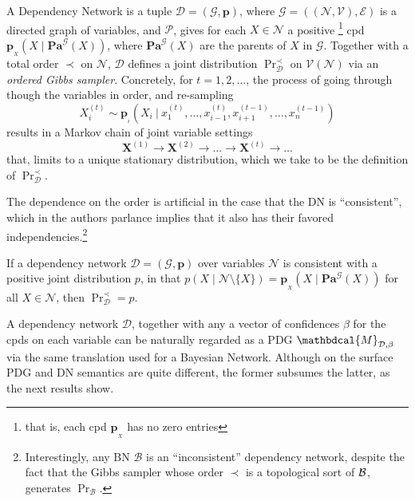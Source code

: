 \documentclass[letterpaper]{article} %
\theoremstyle{plain}
\theoremstyle{definition}
\theoremstyle{remark}
\newcommand{\begthm}[3][]{\begin{#2}[{name=#1},restate=#3,label=#3]}
\newcommand\mat[1]{\mathbf{#1}}
\newcommand{\dg}[1]{\mathbdcal{#1}}
\newcommand\Pa{\mathbf{Pa}}
\newcommand{\bp}[1][L]{\mat{p}_{\!_{#1}\!}}
\newcommand{\V}{\mathcal V}
\newcommand{\N}{\mathcal N}
\newcommand{\Ed}{\mathcal E}
\newcommand{\Gr}{\mathcal G}
\newcommand{\nvvars}[1][\N,\V]{(#1)}
\newcommand{\PDGof}[1]{{\dg M}_{#1}}
\begin{document}
\begin{defn}
A Dependency Network is a tuple $\mathcal D = (\Gr, \mat p) $, where $\Gr = (\nvvars,\Ed)$ is a
directed graph of variables, and $\mathcal P$, gives for each $X \in \N$ a positive%
	\footnote{that is, each cpd $\bp[X]$ has no zero entries}
cpd $\bp[X](X \mid \Pa^{\Gr}(X))$, where $\Pa^{\Gr}(X)$ are the parents of $X$ in $\Gr$.
Together with a total order $\prec$ on $\N$,
$\mathcal D$ defines a joint distribution $\Pr^\prec_{\mathcal D}$ on $\V(\N)$ via an \emph{ordered Gibbs sampler}. Concretely, for $t= 1,2, \ldots$, the process of going through though the variables in order, and re-sampling
\[
	 X_i^{(t)} \sim \bp[i]\left(X_i ~\big|~ x_1^{(t)}, \ldots, x_{i-1}^{(t)}, x_{i+1}^{(t-1)}, \ldots, x^{(t-1)}_{n} \right) 
\]
results in a Markov chain of joint variable settings
\[ \mat X^{(1)} \to \mat X^{(2)} \to \ldots \to \mat X^{(t)} \to \ldots \]
that, %
limits to a unique stationary distribution, which we take to be the definition of $\Pr^\prec_{\mathcal D}$.
\end{defn}

The dependence on the order is artificial in the case that the DN is ``consistent'', which in the authors parlance implies that it also has their favored independencies.\footnote{Interestingly, any BN $\mathcal B$ is an ``inconsistent'' dependency network, despite the fact that the Gibbs sampler whose order $\prec$ is a topological sort  of $\cal B$, generates $\Pr_{\mathcal B}$.}

\begthm[\citeauthor{heckerman2000dependency}]{theorem}{thm:dns-uniq}
If a dependency network $\mathcal D \!=\! (\Gr, \mat p)$ over variables $\N$ is consistent with a positive joint distribution $p$,
in that $p(X \mid \N\setminus \{X\}) = \bp[X](X \mid \Pa^{\Gr}(X))$ for all $X \in \N$,
 then $\Pr_{\mathcal D}^\prec = p$.
\end{theorem}

A dependency network $\mathcal D$, together with any a vector of confidences $\beta$ for the cpds on each variable
can be naturally regarded as a PDG $\PDGof{\mathcal D, \beta}$ 
via the same translation used for a Bayesian Network.
Although on the surface PDG and DN semantics are quite
different,
the former subsumes the latter, as the next results show.
\end{document}
